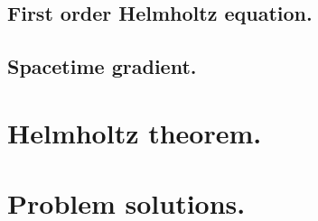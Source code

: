       \subsection{First order Helmholtz equation.}
         
      \subsection{Spacetime gradient.}
         
   \section{Helmholtz theorem.}
      
      
   \section{Problem solutions.}
      \shipoutAnswer

